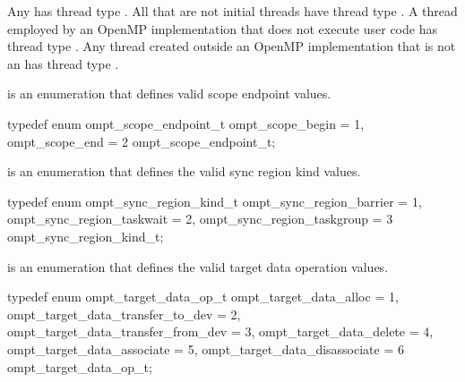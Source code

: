 Any  has thread type .
All  that are not initial threads have thread
type .  A thread employed by an OpenMP
implementation that does not execute user code has thread type
.  Any thread created outside an OpenMP
implementation that is not an  has thread type
.


\label{sec:ompt_scope_endpoint_t}
 is an enumeration that defines valid scope endpoint values.


\begin{ccppspecific}
\begin{omptEnum}
typedef enum ompt_scope_endpoint_t {
  ompt_scope_begin                    = 1,
  ompt_scope_end                      = 2
} ompt_scope_endpoint_t;
\end{omptEnum}
\end{ccppspecific}





\label{sec:ompt_sync_region_kind_t}
 is an enumeration that defines the valid sync region kind values.


\begin{ccppspecific}
\begin{omptEnum}
typedef enum ompt_sync_region_kind_t {
  ompt_sync_region_barrier            = 1,
  ompt_sync_region_taskwait           = 2,
  ompt_sync_region_taskgroup          = 3
} ompt_sync_region_kind_t;
\end{omptEnum}
\end{ccppspecific}





\label{sec:ompt_target_data_op_t}
 is an enumeration that defines the valid target data operation values.


\begin{ccppspecific}
\begin{omptEnum}
typedef enum ompt_target_data_op_t {
  ompt_target_data_alloc              = 1,
  ompt_target_data_transfer_to_dev    = 2,
  ompt_target_data_transfer_from_dev  = 3,
  ompt_target_data_delete             = 4,
  ompt_target_data_associate          = 5,
  ompt_target_data_disassociate       = 6
} ompt_target_data_op_t;
\end{omptEnum}
\end{ccppspecific}




